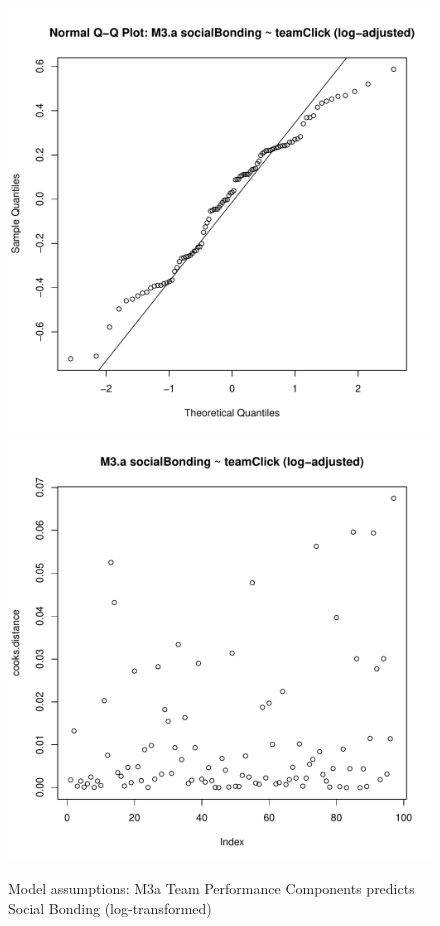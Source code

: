 \begin{figure}[htbp]
        \includegraphics[scale =.4]{images/MLM3aLogQQNorm.pdf}
        \includegraphics[scale =.4]{images/MLM3aLogCooksD.pdf}
        \caption{Model assumptions: M3a Team Performance Components predicts Social Bonding (log-transformed)}
        \label{fig:MLM3aLogAssumptions}
      \end{figure}







